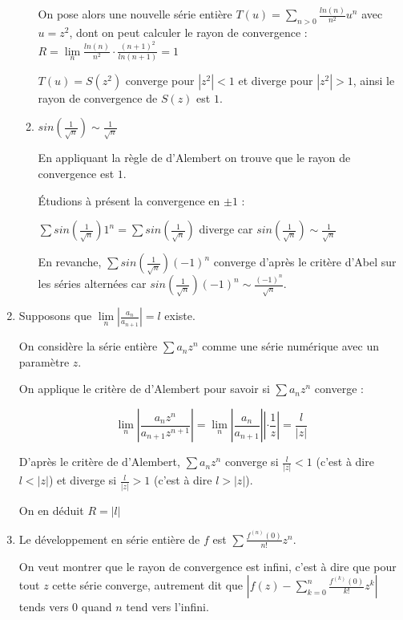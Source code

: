 \documentclass[]{article}
\begin{document}
\begin{enumerate}
\begin{enumerate}
	On pose alors une nouvelle série entière $T(u)=\displaystyle \sum_{n > 0} \frac{ln(n)}{n^2} u^n$ avec $u=z^2$, dont on peut calculer le rayon de convergence : $R = \lim\limits_{n} \frac{ln(n)}{n^2} \cdot \frac{(n+1)^2}{ln(n+1)} = 1$
	
	$T(u)=S(z^2)$ converge pour $|z^2| < 1$ et diverge pour $|z^2| > 1$, ainsi le rayon de convergence de $S(z)$ est $1$.
	
	\item
	$sin\left(\frac{1}{\sqrt{n}}\right) \sim \frac{1}{\sqrt{n}}$
	
	En appliquant la règle de d'Alembert on trouve que le rayon de convergence est $1$.
	
	Étudions à présent la convergence en $\pm 1$ :
	
	$\sum sin\left(\frac{1}{\sqrt{n}}\right)1^n=\sum sin\left(\frac{1}{\sqrt{n}}\right)$ diverge car $sin\left(\frac{1}{\sqrt{n}}\right) \sim \frac{1}{\sqrt{n}}$
	
	En revanche, $\sum sin\left(\frac{1}{\sqrt{n}}\right)(-1)^n$ converge d'après le critère d'Abel sur les séries alternées car $sin\left(\frac{1}{\sqrt{n}}\right)(-1)^n \sim \frac{(-1)^n}{\sqrt{n}}$.
\end{enumerate}

\item Supposons que $\lim\limits_{n} \left|\frac{a_n}{a_{n+1}}\right|=l$ existe.

On considère la série entière $\sum a_n z^n$ comme une série numérique avec un paramètre $z$.

On applique le critère de d'Alembert pour savoir si $\sum a_n z^n$ converge : 

$$\lim\limits_{n} \left|\frac{a_n z^n}{a_{n+1} z^{n+1}}\right| = \lim\limits_{n} \left|\frac{a_n}{a_{n+1}}\right|\left| \cdot \frac{1}{z}\right| = \frac{l}{|z|}$$

D'après le critère de d'Alembert, $\sum a_n z^n$ converge si $\frac{l}{|z|} < 1$ (c'est à dire $l < |z|$) et diverge si $\frac{l}{|z|} > 1$ (c'est à dire $l > |z|$).

On en déduit $R = |l|$

\item Le développement en série entière de $f$ est $\displaystyle \sum \frac{f^{(n)}(0)}{n!}z^n$.

On veut montrer que le rayon de convergence est infini, c'est à dire que pour tout $z$ cette série converge, autrement dit que $\left|f(z) - \sum_{k=0}^{n} \frac{f^{(k)}(0)}{k!}z^k \right|$ tends vers $0$ quand $n$ tend vers l'infini.


\end{enumerate}
\end{document}

